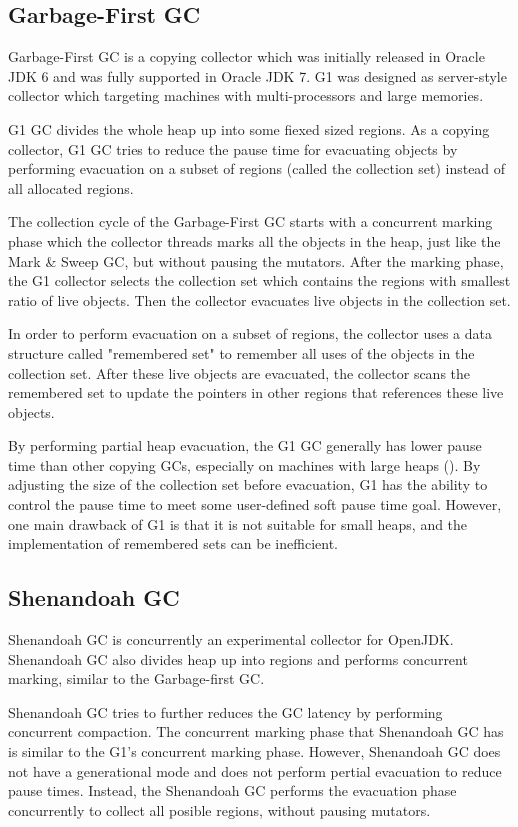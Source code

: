 \subsection{Garbage-First GC}

Garbage-First GC is a copying collector which was initially released in Oracle JDK 6
and was fully supported in Oracle JDK 7. G1 was designed as server-style collector
which targeting machines with multi-processors and large memories. 

G1 GC divides the whole heap up into some fiexed sized regions. 
As a copying collector, G1 GC tries to reduce the pause time for evacuating objects
by performing evacuation on a subset of regions (called the collection set) instead of
all allocated regions.

The collection cycle of the Garbage-First GC starts with a concurrent marking phase
which the collector threads marks all the objects in the heap, just like the Mark \&
Sweep GC, but without pausing the mutators.
After the marking phase, the G1 collector selects the collection set which contains
the regions with smallest ratio of live objects.
Then the collector evacuates live objects in the collection set.

In order to perform evacuation on a subset of regions, the collector uses a data structure
called "remembered set" to remember all uses of the objects in the collection set.
After these live objects are evacuated, the collector scans the remembered set to
update the pointers in other regions that references these live objects.

By performing partial heap evacuation, the G1 GC generally has lower pause time
than other copying GCs, especially on machines with large heaps (\cite{detlefs2004garbage}).
By adjusting the size of the collection set before evacuation, G1 has the ability
to control the pause time to meet some user-defined soft pause time goal.
However, one main drawback of G1 is that it is not suitable for small heaps,
and the implementation of remembered sets can be inefficient.

\subsection{Shenandoah GC}

Shenandoah GC is concurrently an experimental collector for OpenJDK.
Shenandoah GC also divides heap up into regions and performs concurrent marking,
similar to the Garbage-first GC.

Shenandoah GC tries to further reduces the GC latency by performing concurrent
compaction. The concurrent marking phase that Shenandoah GC has is similar to
the G1's concurrent marking phase. However, Shenandoah GC does not have a generational
mode and does not perform pertial evacuation to reduce pause times.
Instead, the Shenandoah GC performs the evacuation phase concurrently to collect
all posible regions, without pausing mutators.

